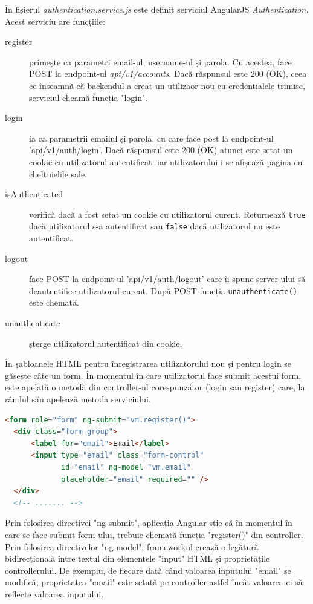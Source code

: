 În fișierul \emph{authentication.service.js} este definit serviciul
AngularJS \emph{Authentication}. Acest serviciu are funcțiile:
\begin{description}
\item [register] primește ca parametri email-ul, username-ul și
parola. Cu acestea, face POST la endpoint-ul \emph{api/v1/accounts}.
Dacă răspunsul este 200 (OK), ceea ce înseamnă că backendul
a creat un utilizaor nou cu credențialele trimise,
serviciul cheamă funcția "login".
\item [login] ia ca parametrii emailul și parola, cu care
face post la endpoint-ul 'api/v1/auth/login'. Dacă răspunsul este
200 (OK) atunci este setat un cookie cu utilizatorul autentificat,
iar utilizatorului i se afișează pagina cu cheltuielile sale.
\item [isAuthenticated] verifică dacă a fost setat
un cookie cu utilizatorul curent. Returnează \texttt{true} dacă 
utilizatorul s-a autentificat sau \texttt{false} dacă utilizatorul
nu este autentificat.
\item [logout] face POST la endpoint-ul 'api/v1/auth/logout' care îi
spune server-ului să deautentifice utilizatorul curent. După POST 
funcția \texttt{unauthenticate()} este chemată.
\item [unauthenticate] șterge utilizatorul autentificat din cookie.
\end{description}



În șabloanele HTML pentru înregistrarea utilizatorului nou și pentru
login se găsește câte un form. În momentul în care utilizatorul face
submit acestui form, este apelată o metodă din controller-ul corespunzător
(login sau register) care, la rândul său apelează metoda serviciului.

\begin{lstlisting}[language=html, title=static/templates/authentication/register.html]
<form role="form" ng-submit="vm.register()">
  <div class="form-group">
      <label for="email">Email</label>
      <input type="email" class="form-control" 
             id="email" ng-model="vm.email"
             placeholder="email" required="" />
  </div>
  <!-- ....... -->
\end{lstlisting}

Prin folosirea directivei "ng-submit", aplicația Angular știe
că în momentul în care se face submit form-ului, trebuie
chemată funcția "register()" din controller. Prin folosirea
directivelor "ng-model", frameworkul crează o legătură
bidirecțională între textul din elementele "input" HTML
și proprietățile controllerului. De exemplu, de fiecare
dată când valoarea inputului "email" se modifică,
proprietatea "email" este setată pe controller astfel încât
valoarea ei să reflecte valoarea inputului.


